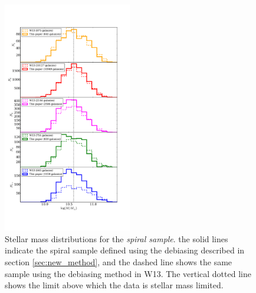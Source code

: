 \documentclass[useAMS,usenatbib]{mn2e}
\begin{document}
\begin{figure}
		\centering

        \includegraphics[width=0.5\textwidth]{Histograms/mass_histogram.pdf}

        \caption{Stellar mass distributions for the \textit{spiral sample}. the solid lines indicate the spiral sample defined using the debiasing described in section \ref{sec:new_method}, and the dashed line shows the same sample using the debiasing method in W13. The vertical dotted line shows the limit above which the data is stellar mass limited.}

        \label{fig:mass_histogram}

\end{figure}
\end{document}
